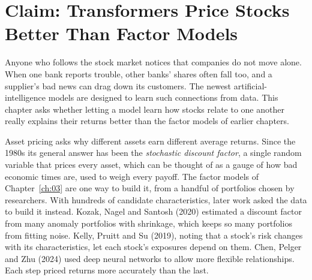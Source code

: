 \makeatletter
{}
\makeatother

\makeatletter
\makeatother

\chapter{Claim: Transformers Price Stocks Better Than Factor Models}
\label{ch:21}
\providecommand{\term}[1]{\emph{#1}}

Anyone who follows the stock market notices that companies do not move alone. When one bank reports trouble, other banks' shares often fall too, and a supplier's bad news can drag down its customers. The newest artificial-intelligence models are designed to learn such connections from data. This chapter asks whether letting a model learn how stocks relate to one another really explains their returns better than the factor models of earlier chapters.

Asset pricing asks why different assets earn different average returns. Since the 1980s its general answer has been the \term{stochastic discount factor}, a single random variable that prices every asset, which can be thought of as a gauge of how bad economic times are, used to weigh every payoff. The factor models of Chapter~\ref{ch:03} are one way to build it, from a handful of portfolios chosen by researchers. With hundreds of candidate characteristics, later work asked the data to build it instead. Kozak, Nagel and Santosh (2020) estimated a discount factor from many anomaly portfolios with shrinkage, which keeps so many portfolios from fitting noise. Kelly, Pruitt and Su (2019), noting that a stock's risk changes with its characteristics, let each stock's exposures depend on them. Chen, Pelger and Zhu (2024) used deep neural networks to allow more flexible relationships. Each step priced returns more accurately than the last.

